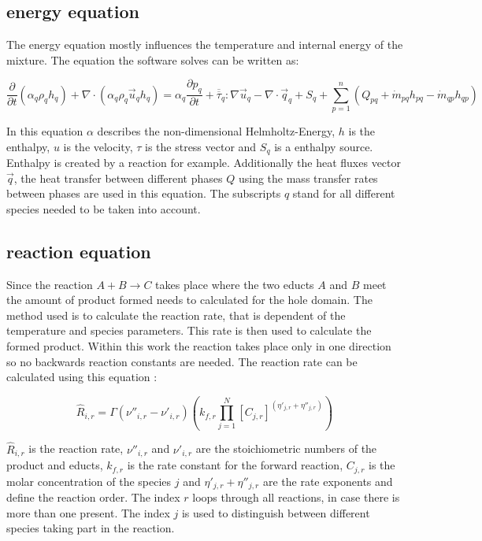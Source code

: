 \documentclass[../thesis.tex]{subfiles}
\begin{document}
\subsection{energy equation}

The energy equation mostly influences the temperature and internal energy of the mixture. The equation the software solves can be written as:

\begin{equation} 
	\frac{\partial}{\partial t} (\alpha_q \rho_q h_q ) + \nabla \cdot (\alpha_q \rho_q \vec u_q h_q )   = \alpha_q \frac{\partial p_q}{\partial t} + \overline{\overline{\tau}}_q : \nabla \vec u_q - \nabla \cdot \vec q_q + S_q + \sum_{p=1}^n (Q_{pq}  + \dot{m}_{pq} h_{pq} - \dot{m}_{qp} h_{qp}) 
\end{equation}

In this equation $\alpha$ describes the non-dimensional Helmholtz-Energy, $h$ is the enthalpy, $u$ is the velocity, $\tau$ is the stress vector and $S_q$ is a enthalpy source. Enthalpy is created by a reaction for example. Additionally the heat fluxes vector $ \vec q$, the heat transfer between different phases $Q$ using the mass transfer rates between phases are used in this equation. The subscripts $q$ stand for all different species needed to be taken into account. 

\subsection{reaction equation}

Since the reaction $ A + B \rightarrow C$ takes place where the two educts $A$ and $B$ meet the amount of product formed needs to calculated for the hole domain. The method used is to calculate the reaction rate, that is dependent of the temperature and species parameters. This rate is then used to calculate the formed product. Within this work the reaction takes place only in one direction so no backwards reaction constants are needed. The reaction rate can be calculated using this equation \cite{manual2009ansys}:

\begin{equation}
	\label{eqn:reaction}
	\hat{R}_{i,r} = {\Gamma} \left(\nu''_{i,r} - \nu'_{i,r} \right) \left(k_{f,r} \prod_{j=1}^{N} \left[C_{j,r} \right]^{(\eta'_{j,r} + \eta''_{j,r})} \right) 
\end{equation}

$\hat{R}_{i,r}$ is the reaction rate, $\nu''_{i,r}$ and $\nu'_{i,r}$ are the stoichiometric numbers of the product and educts, $k_{f,r}$ is the rate constant for the forward reaction, $C_{j,r}$ is the molar concentration of the species $j$ and $\eta'_{j,r} + \eta''_{j,r}$ are the rate exponents and define the reaction order. 
The index $r$ loops through all reactions, in case there is more than one present. The index $j$ is used to distinguish between different species taking part in the reaction.
\end{document}
